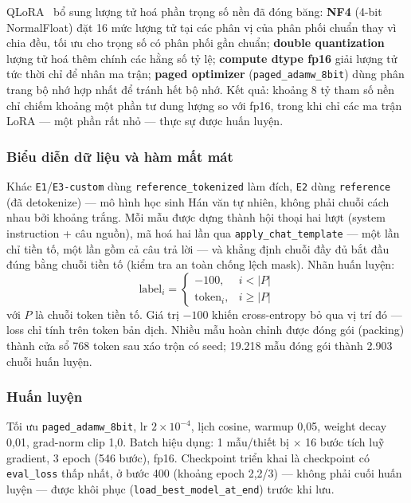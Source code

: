 QLoRA~\cite{dettmers2023qlora} bổ sung lượng tử hoá phần trọng số nền đã đóng băng:
\textbf{NF4} (4-bit NormalFloat) đặt 16 mức lượng tử tại các phân vị của phân phối chuẩn
thay vì chia đều, tối ưu cho trọng số có phân phối gần chuẩn; \textbf{double
quantization} lượng tử hoá thêm chính các hằng số tỷ lệ; \textbf{compute dtype fp16}
giải lượng tử tức thời chỉ để nhân ma trận; \textbf{paged optimizer}
(\texttt{paged\_adamw\_8bit}) dùng phân trang bộ nhớ hợp nhất để tránh hết bộ nhớ. Kết
quả: khoảng 8 tỷ tham số nền chỉ chiếm khoảng một phần tư dung lượng so với fp16, trong
khi chỉ các ma trận LoRA — một phần rất nhỏ — thực sự được huấn luyện.

\subsubsection{Biểu diễn dữ liệu và hàm mất mát}

Khác \texttt{E1}/\texttt{E3-custom} dùng \texttt{reference\_tokenized} làm đích,
\texttt{E2} dùng \texttt{reference} (đã detokenize) — mô hình học sinh Hán văn tự nhiên,
không phải chuỗi cách nhau bởi khoảng trắng. Mỗi mẫu được dựng thành hội thoại hai lượt
(system instruction + câu nguồn), mã hoá hai lần qua \texttt{apply\_chat\_template} —
một lần chỉ tiền tố, một lần gồm cả câu trả lời — và khẳng định chuỗi đầy đủ bắt đầu
đúng bằng chuỗi tiền tố (kiểm tra an toàn chống lệch mask). Nhãn huấn luyện:
\begin{equation}
  \text{label}_i =
  \begin{cases}
    -100, & i < |P| \\
    \text{token}_i, & i \ge |P|
  \end{cases}
  \label{eq:e2-loss-mask}
\end{equation}
với $P$ là chuỗi token tiền tố. Giá trị $-100$ khiến cross-entropy bỏ qua vị trí đó — loss
chỉ tính trên token bản dịch. Nhiều mẫu hoàn chỉnh được đóng gói (packing) thành cửa sổ
768 token sau xáo trộn có seed; 19.218 mẫu đóng gói thành 2.903 chuỗi huấn luyện.

\subsubsection{Huấn luyện}

Tối ưu \texttt{paged\_adamw\_8bit}, lr $2\times10^{-4}$, lịch cosine, warmup 0,05,
weight decay 0,01, grad-norm clip 1,0. Batch hiệu dụng: 1 mẫu/thiết bị $\times$ 16 bước
tích luỹ gradient, 3 epoch (546 bước), fp16. Checkpoint triển khai là checkpoint có
\texttt{eval\_loss} thấp nhất, ở bước 400 (khoảng epoch 2,2/3) — không phải cuối huấn
luyện — được khôi phục (\texttt{load\_best\_model\_at\_end}) trước khi lưu.

